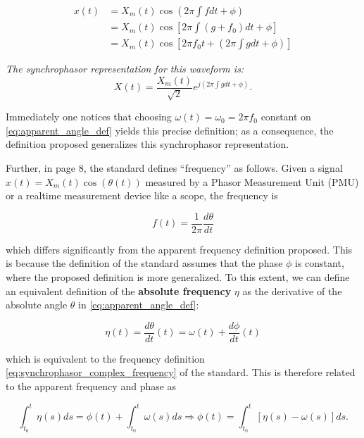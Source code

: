 \begin{align}
	x(t) &= X_m(t) \cos\left(2\pi \int f dt + \phi\right) \nonumber\\[3mm]
	&= X_m(t) \cos\left[2\pi \int \left(g + f_0\right) dt + \phi\right] \nonumber\\[3mm]
	&= X_m(t) \cos\left[2\pi f_0 t + \left(2\pi \int gdt + \phi\right)\right] \label{eq:synchrophasor_time}
\end{align}

	\textit{The synchrophasor representation for this waveform is:}
\begin{equation} X(t) = \dfrac{X_m(t)}{\sqrt{2}} e^{j\left(2\pi \int gdt + \phi\right)} . \label{eq:synchrophasor_complex}\end{equation}

	Immediately one notices that choosing $\omega(t) = \omega_0 = 2\pi f_0$ constant on \eqref{eq:apparent_angle_def} yields this precise definition; as a consequence, the definition proposed generalizes this synchrophasor representation.

	Further, in page 8, the standard defines ``frequency'' as follows. Given a signal $x(t) = X_m(t)\cos\left(\theta(t)\right)$ measured by a Phasor Measurement Unit (PMU) or a realtime measurement device like a scope, the frequency is

\begin{equation} f(t) = \dfrac{1}{2\pi} \dfrac{d\theta}{dt} \label{eq:synchrophasor_complex_frequency}\end{equation}

	\noindent which differs significantly from the apparent frequency definition proposed. This is because the definition of the standard assumes that the phase $\phi$ is constant, where the proposed definition is more generalized. To this extent, we can define an equivalent definition of the \textbf{absolute frequency} $\eta$ as the derivative of the absolute angle $\theta$ in \eqref{eq:apparent_angle_def}:

\begin{equation} \eta(t) = \dfrac{d\theta}{dt}(t) = \omega(t) + \dfrac{d\phi}{dt}(t)\end{equation}

	\noindent which is equivalent to the frequency definition \eqref{eq:synchrophasor_complex_frequency} of the standard. This is therefore related to the apparent frequency and phase as

\begin{equation} \int_{t_0}^t \eta(s)ds = \phi(t) + \int_{t_0}^t \omega(s)ds \Rightarrow \phi(t) = \int_{t_0}^t \left[\eta(s) - \omega(s)\right]ds . \end{equation}

